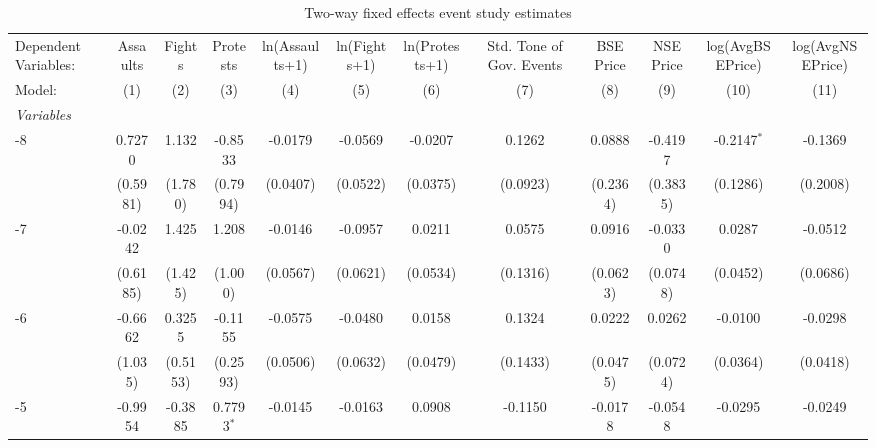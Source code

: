 
\begin{table}[htbp]
   \caption{\label{tab:twfe} Two-way fixed effects event study estimates}
   \centering
   \begin{tabular}{lccccccccccc}
      \tabularnewline \midrule \midrule
      Dependent Variables: & Assaults     & Fights        & Protests     & ln(Assaults+1) & ln(Fights+1)   & ln(Protests+1) & Std. Tone of Gov. Events & BSE Price      & NSE Price      & log(AvgBSEPrice) & log(AvgNSEPrice)\\  
      Model:               & (1)          & (2)           & (3)          & (4)            & (5)            & (6)            & (7)                      & (8)            & (9)            & (10)             & (11)\\  
      \midrule
      \emph{Variables}\\
      -8                   & 0.7270       & 1.132         & -0.8533      & -0.0179        & -0.0569        & -0.0207        & 0.1262                   & 0.0888         & -0.4197        & -0.2147$^{*}$    & -0.1369\\   
                           & (0.5981)     & (1.780)       & (0.7994)     & (0.0407)       & (0.0522)       & (0.0375)       & (0.0923)                 & (0.2364)       & (0.3835)       & (0.1286)         & (0.2008)\\   
      -7                   & -0.0242      & 1.425         & 1.208        & -0.0146        & -0.0957        & 0.0211         & 0.0575                   & 0.0916         & -0.0330        & 0.0287           & -0.0512\\   
                           & (0.6185)     & (1.425)       & (1.000)      & (0.0567)       & (0.0621)       & (0.0534)       & (0.1316)                 & (0.0623)       & (0.0748)       & (0.0452)         & (0.0686)\\   
      -6                   & -0.6662      & 0.3255        & -0.1155      & -0.0575        & -0.0480        & 0.0158         & 0.1324                   & 0.0222         & 0.0262         & -0.0100          & -0.0298\\   
                           & (1.035)      & (0.5153)      & (0.2593)     & (0.0506)       & (0.0632)       & (0.0479)       & (0.1433)                 & (0.0475)       & (0.0724)       & (0.0364)         & (0.0418)\\   
      -5                   & -0.9954      & -0.3885       & 0.7793$^{*}$ & -0.0145        & -0.0163        & 0.0908         & -0.1150                  & -0.0178        & -0.0548        & -0.0295          & -0.0249\\   

\end{tabular}
\end{table}
